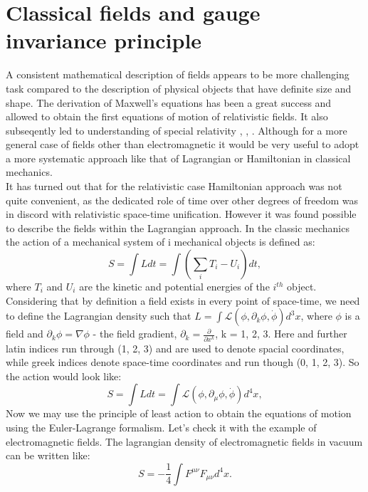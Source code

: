\section{Classical fields and gauge invariance principle}
\label{sec::gauge}
A consistent mathematical description of fields appears to be more challenging task compared to the description of physical objects that have definite size and shape. The derivation of Maxwell's equations has been a great success and allowed to obtain the first equations of motion of relativistic fields. It also subseqently led to understanding of special relativity \cite{einstein}, \cite{pointcarre}, \cite{lorentz}. Although for a more general case of fields other than electromagnetic it would be very useful to adopt a more systematic approach like that of Lagrangian or Hamiltonian in classical mechanics. \\
It has turned out that for the relativistic case Hamiltonian approach was not quite convenient, as the dedicated role of time over other degrees of freedom was in discord with relativistic space-time unification. However it was found possible to describe the fields within the Lagrangian approach. In the classic mechanics the action of a mechanical system of i mechanical objects is defined as:
 \begin{equation}
\nonumber
S = \int Ldt = \int \left( \sum_i T_i - U_i \right) dt,
\end{equation}
where $T_i$ and $U_i$ are the kinetic and potential energies of the $i^{th}$ object. Considering that by definition a field exists in every point of space-time, we need to define the Lagrangian density such that $L = \int \mathcal{L}(\phi,\partial_{k}\phi,\dot\phi ) d^3x$, where $\phi$ is a field and $\partial_{k}\phi = \nabla\phi$ - the field gradient, $\partial_{k} = \frac{\partial}{\partial x^{k}}$,  k = 1, 2, 3. Here and further latin indices run through (1, 2, 3) and are used to denote spacial coordinates, while greek indices denote space-time coordinates and run though (0, 1, 2, 3). So the action would look like: 
 \begin{equation}
S = \int Ldt =\int \mathcal{L}(\phi,\partial_{\mu}\phi,\dot\phi ) d^4x,
\end{equation}
Now we may use the principle of least action to obtain the equations of motion using the Euler-Lagrange formalism. Let's check it with the example of electromagnetic fields. The lagrangian density of electromagnetic fields in vacuum can be written like:
 \begin{equation}
S = -\frac{1}{4}\int F^{\mu \nu}F_{\mu \nu}d^4x.
\end{equation}

